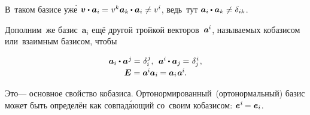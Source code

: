 \begin{otherlanguage}{russian}

\vspace{-0.16em}
В~таком базисе уж\'{е} ${\bm{v} \dotp \bm{a}_i \hspace{-0.1ex} = \hspace{.1ex} v^{k} \bm{a}_k \hspace{-0.1ex} \dotp \bm{a}_i \neq\vspace{.2ex} v^{i}}$\hspace{-0.25ex}, ведь~тут ${\bm{a}_i \hspace{-0.1ex} \dotp \bm{a}_k \neq\vspace{.2ex} \delta_{ik}}$.

Дополним~же \hbox{базис}~${\bm{a}_i}$ ещё другой тройкой векторов~\hbox{${\bm{a}^{\hspace{-0.05ex}i}}$\hspace{-0.25ex},} \hbox{называемых} кобазисом или~взаимным базисом, чтобы

\nopagebreak\vspace{-0.3em}\begin{equation}\label{fundamentalpropertyofcobasis}
\begin{array}{c}
\bm{a}_i \dotp \bm{a}^{\hspace{.1ex}j} \hspace{-0.1ex} = \hspace{.1ex} \delta_i^{\hspace{.1ex}j} , \:\:
\bm{a}^{\hspace{-0.05ex}i} \hspace{-0.1ex} \dotp \bm{a}_j \hspace{-0.1ex} = \hspace{.1ex} \delta_{\hspace{-0.1ex}j}^{\hspace{.1ex}i}
\hspace{.16ex} ,
\\[.2em]
\UnitDyad = \bm{a}^{\hspace{-0.1ex}i} \hspace{-0.1ex} \bm{a}_i \hspace{-0.1ex} = \bm{a}_i \hspace{.1ex} \bm{a}^{\hspace{-0.1ex}i}
\hspace{-0.2ex} .
\end{array}
\end{equation}

\vspace{-0.1em}\noindent
Это\:--- основное свойство кобазиса.
Орто\-нормирован\-ный~(орто\-нормаль\-ный) базис может быть определён как совпад\'{а}ющий со~своим кобазисом: ${\bm{e}^{\hspace{.05ex}i} \hspace{-0.2ex} = \bm{e}_{i}}$.


\end{otherlanguage}
